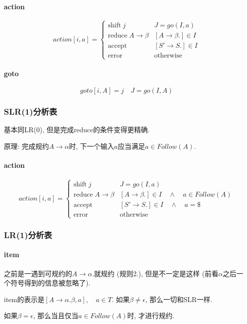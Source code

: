 \documentclass{ctexart}
\begin{document}
\paragraph{action} \[action[i, a] = \begin{cases}
    \text{shift}\; j          & J = go(I, a)\\
    \text{reduce}\; A\to\beta & [A \to \beta.] \in I\\
    \text{accept}             & [S' \to S.] \in I\\
    \text{error}              & \text{otherwise}
    \end{cases}\]
\paragraph{goto} \[goto[i, A] = j \quad J = go(I, A)\]

\subsubsection{SLR(1)分析表}
    基本同LR(0), 但是完成reduce的条件变得更精确.\par
    原理: 完成规约$A\to\alpha$时, 下一个输入$a$应当满足$a \in Follow(A)$.
\paragraph{action} \[action[i, a] = \begin{cases}
    \text{shift}\; j          & J = go(I, a)\\
    \text{reduce}\; A\to\beta & [A \to \beta.] \in I \quad\land\quad a \in Follow(A)\\
    \text{accept}             & [S' \to S.] \in I \quad\land\quad a = \$\\
    \text{error}              & \text{otherwise}
    \end{cases}\]

\subsubsection{LR(1)分析表}
\paragraph{item} 之前是一遇到可规约的$A \to \alpha.$就规约 (规则2.),
    但是不一定是这样 (前看$\alpha$之后一个符号得到的信息被忽略了).\par
    item的表示是$[A \to \alpha . \beta, a],\quad a \in T$. 如果$\beta \neq \epsilon$, 那么一切和SLR一样.\par
    如果$\beta = \epsilon$, 那么当且仅当$a \in Follow(A)$时, 才进行规约.
\end{document}

